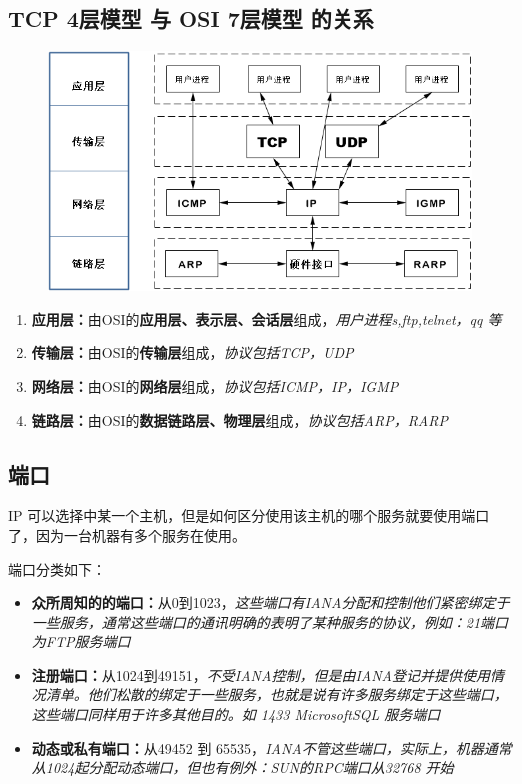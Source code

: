 \documentclass[UTF8,a4paper,12pt]{ctexbook}
\begin{document}
		\subsection{TCP 4层模型 与 OSI 7层模型 的关系}
			\begin{figure}[h]
				\centering
				\includegraphics[scale = 0.8]{figures/TCP-4.png}
			\end{figure}
			 \begin{enumerate}
			 	\item \textbf{应用层：}由OSI的\textbf{应用层、表示层、会话层}组成，\textit{用户进程s,ftp,telnet，qq 等}
			 	\item \textbf{传输层：}由OSI的\textbf{传输层}组成，\textit{协议包括TCP，UDP}
			 	\item \textbf{网络层：}由OSI的\textbf{网络层}组成，\textit{协议包括ICMP，IP，IGMP}
			 	\item \textbf{链路层：}由OSI的\textbf{数据链路层、物理层}组成，\textit{协议包括ARP，RARP}
			 \end{enumerate}
			
		\subsection{端口}
				IP 可以选择中某一个主机，但是如何区分使用该主机的哪个服务就要使用端口了，因为一台机器有多个服务在使用。
				
				端口分类如下：
				\begin{itemize}
					\item \textbf{众所周知的的端口：}从0到1023，\textit{这些端口有IANA分配和控制他们紧密绑定于一些服务，通常这些端口的通讯明确的表明了某种服务的协议，例如：21端口为FTP服务端口}
					\item \textbf{注册端口：}从1024到49151，\textit{不受IANA控制，但是由IANA登记并提供使用情况清单。他们松散的绑定于一些服务，也就是说有许多服务绑定于这些端口，这些端口同样用于许多其他目的。如 1433 MicrosoftSQL 服务端口}
					\item \textbf{动态或私有端口：}从49452 到 65535，\textit{IANA不管这些端口，实际上，机器通常从1024起分配动态端口，但也有例外：SUN的RPC端口从32768 开始}
				\end{itemize}
	
\end{document}
